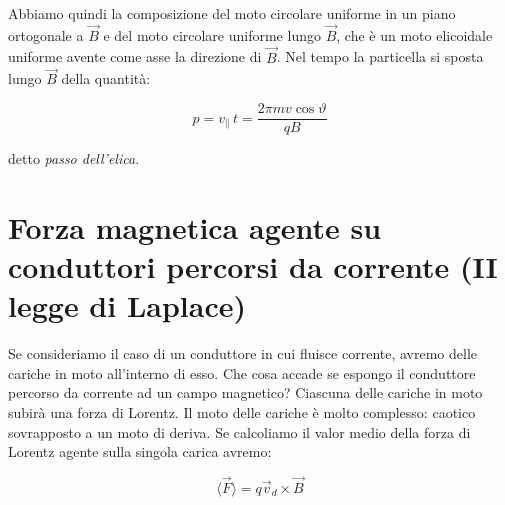 \begin{figure}[htpb]
\end{figure}
\FloatBarrier

Abbiamo quindi la composizione del moto circolare uniforme in un piano ortogonale a $\vec{B}$ e del moto circolare uniforme lungo $\vec{B}$, che è un moto elicoidale uniforme avente come asse la direzione di $\vec{B}$. Nel tempo la particella si sposta lungo $\vec{B}$ della quantità:

\[
	p=v_{\parallel}\, t= \frac{2\pi mv\cos \vartheta}{qB}
\]

detto \emph{passo dell'elica}.

\section{Forza magnetica agente su conduttori percorsi da corrente (II legge di Laplace)}

Se consideriamo il caso di un conduttore in cui fluisce corrente, avremo delle cariche in moto all'interno di esso. Che cosa accade se espongo il conduttore percorso da corrente ad un campo magnetico? Ciascuna delle cariche in moto subirà una forza di Lorentz. Il moto delle cariche è molto complesso: caotico sovrapposto a un moto di deriva. Se calcoliamo il valor medio della forza di Lorentz agente sulla singola carica avremo:

\[
	\langle \vec{F} \rangle = q\vec{v}_d\times \vec{B}
\]

